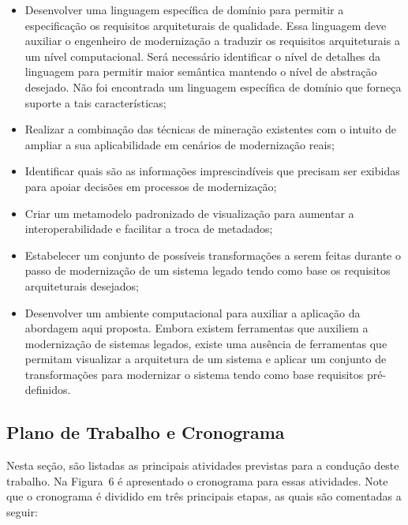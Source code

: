 \documentclass[12pt]{article}
\begin{document}
\begin{itemize}
\item Desenvolver uma linguagem específica de domínio para permitir a especificação os requisitos arquiteturais de qualidade. Essa linguagem deve auxiliar o engenheiro de modernização a traduzir os requisitos arquiteturais a um nível computacional. Será necessário identificar o nível de detalhes da linguagem para permitir maior semântica mantendo o nível de abstração desejado. Não foi encontrada um linguagem específica de domínio que forneça suporte a tais características;
\item Realizar a combinação das técnicas de mineração existentes com o intuito de ampliar a sua aplicabilidade em cenários de modernização reais;
\item Identificar quais são as informações imprescindíveis que precisam ser exibidas para apoiar decisões em processos de modernização;
\item Criar um metamodelo padronizado de visualização para aumentar a interoperabilidade e facilitar a troca de metadados;
\item Estabelecer um conjunto de possíveis transformações a serem feitas durante o passo de modernização de um sistema legado tendo como base os requisitos arquiteturais desejados;
\item Desenvolver um ambiente computacional para auxiliar a aplicação da abordagem aqui proposta. Embora existem ferramentas que auxiliem a modernização de sistemas legados, existe uma ausência de ferramentas que permitam visualizar a arquitetura de um sistema e aplicar um conjunto de transformações para modernizar o sistema tendo como base requisitos pré-definidos.

\end{itemize}

\subsection{Plano de Trabalho e Cronograma}

Nesta seção, são listadas as principais atividades previstas para a condução deste trabalho. Na Figura~6 é apresentado o cronograma para essas atividades. Note que o cronograma é dividido em três principais etapas, as quais são comentadas a seguir:
\end{document}
